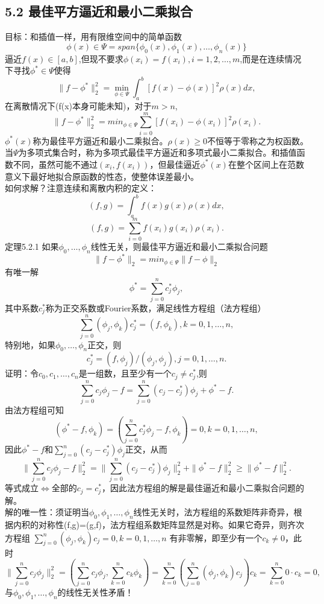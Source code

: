 \documentclass[a4paper,12pt]{article}
\begin{document}
\begin{CJK*}{UTF8}{gbsn}
	\section{5.2 最佳平方逼近和最小二乘拟合}
	目标：和插值一样，用有限维空间中的简单函数
	$$\phi(x)\in \Psi = span\{\phi_0(x),\phi_1(x),\ldots,\phi_n(x)\}$$
	逼近$f(x)\in[a,b]$,但现不要求$\phi(x_i)=f(x_i),i=1,2,\ldots,m$,而是在连续情况下寻找$\phi^*\in \Psi$使得
	$$\|f-\phi^*\|_2^2 = \min_{\phi\in\Psi}\int_a^b[f(x)-\phi(x)]^2\rho(x)dx,$$
	在离散情况下(f(x)本身可能未知)，对于$m>n$,
	$$\|f-\phi^*\|_2^2 = min_{\phi\in\Psi}\sum\limits_{i=0}^{m}[f(x_i)-\phi(x_i)]^2\rho(x_i).$$
	$\phi^*(x)$称为最佳平方逼近和最小二乘拟合。$\rho(x)\ge0$不恒等于零称之为权函数。当$\Psi$为多项式集合时，称为多项式最佳平方逼近和多项式最小二乘拟合。和插值函数不同，虽然可能不通过$(x_i,f(x_i))$，但最佳逼近$\phi^*(x)$在整个区间上在范数意义下最好地拟合原函数的性态，使整体误差最小。\\
	如何求解？注意连续和离散内积的定义：
	$$ (f,g)=\int_a^bf(x)g(x)\rho(x)dx,$$
	$$ (f,g) = \sum\limits_{i=0}^{m}f(x_i)g(x_i)\rho(x_i).$$
	定理5.2.1 如果$\phi_0,\ldots,\phi_n$线性无关，则最佳平方逼近和最小二乘拟合问题
	$$\|f-\phi^*\|_2 = min_{\phi\in\Psi}\|f-\phi\|_2$$
	有唯一解$$\phi^* = \sum\limits_{j=0}^nc_j^*\phi_j,$$
	其中系数$c_j^*$称为正交系数或Fourier系数，满足线性方程组（法方程组）
	$$\sum\limits_{j=0}^n(\phi_j,\phi_k)c_j^*=(f,\phi_k),k=0,1,\ldots,n,$$
	特别地，如果$\phi_0,\ldots,\phi_n$正交，则
	$$c_j^* = (f,\phi_j)/(\phi_j,\phi_j),j=0,1,\ldots,n.$$
	证明：令$c_0,c_1,\ldots,c_n$是一组数，且至少有一个$c_j\neq c_j^*$,则
	$$\sum\limits_{j=0}^nc_j\phi_j-f = \sum\limits_{j=0}^n(c_j-c_j^*)\phi_j + \phi^* -f.$$
	由法方程组可知
	$$(\phi^*-f,\phi_k)=(\sum_{j=0}^nc_j^*\phi_j - f,\phi_k)=0,k=0,1,\ldots,n,$$
	因此$\phi^*-f$和$\sum\limits_{j=0}^n(c_j-c_j^*)\phi_j$正交，从而
	$$\|\sum\limits_{j=0}^nc_j\phi_j-f\|_2^2 = \|\sum\limits_{j=0}^n(c_j-c_j^*)\phi_j\|_2^2 + \|\phi^*-f\|_2^2 \ge \|\phi^*-f\|_2^2.$$
	等式成立$\Leftrightarrow$全部的$c_j=c_j^*$，因此法方程组的解是最佳逼近和最小二乘拟合问题的解。\\
	解的唯一性：须证明当$\phi_0,\phi_1,\ldots,\phi_n$线性无关时，法方程组的系数矩阵非奇异，根据内积的对称性(f,g)=(g,f)，法方程组系数矩阵显然是对称。如果它奇异，则齐次方程组
	$\sum\limits_{j=0}^n(\phi_j,\phi_k)c_j=0,k=0,1,\ldots,n$
	有非零解，即至少有一个$c_k\neq0$，此时
	$$\|\sum\limits_{j=0}^nc_j\phi_j\|_2^2 = (\sum\limits_{j=0}^nc_j\phi_j,\sum\limits_{k=0}^nc_k\phi_k)
	= \sum\limits_{k=0}^n(\sum\limits_{j=0}^n(\phi_j,\phi_k)c_j)c_k
	= \sum\limits_{k=0}^n0\cdot c_k=0,$$
	与$\phi_0,\phi_1,\ldots,\phi_n$的线性无关性矛盾！\\

\end{CJK*}
\end{document}
